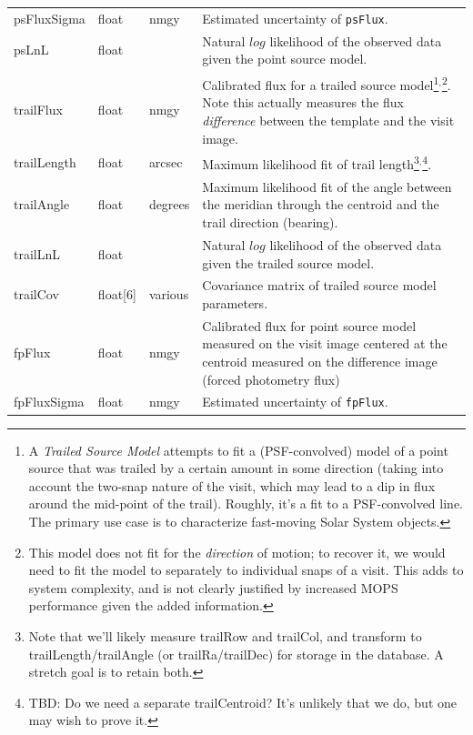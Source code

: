 \documentclass[12pt]{article}
\begin{document}
\begin{center}
\begin{longtable}{p{3cm}p{2cm}p{2cm}p{5cm}}
psFluxSigma & float & nmgy & Estimated uncertainty of \texttt{psFlux}. \\

psLnL & float & ~ & Natural $log$ likelihood of the observed data given the point source model. \\ 

trailFlux & float & nmgy & Calibrated flux for a trailed source model\footnote{A {\em Trailed Source Model} attempts to fit a (PSF-convolved) model of a point source that was trailed by a certain amount in some direction (taking into account the two-snap nature of the visit, which may lead to a dip in flux around the mid-point of the trail). Roughly, it's a fit to a PSF-convolved line. The primary use case is to characterize fast-moving Solar System objects.}$^,$\footnote{This model does not fit for the {\em direction} of motion; to recover it, we would need to fit the model to separately to individual snaps of a visit. This adds to system complexity, and is not clearly justified by increased MOPS performance given the added information.}. Note this actually measures the flux {\em difference} between the template and the visit image. \\ 

trailLength & float & arcsec & Maximum likelihood fit of trail length\footnote{Note that we'll likely measure trailRow and trailCol, and transform to trailLength/trailAngle (or trailRa/trailDec) for storage in the database. A stretch goal is to retain both.}$^,$\footnote{TBD: Do we need a separate trailCentroid? It's unlikely that we do, but one may wish to prove it.}. \\ 

trailAngle & float & degrees & Maximum likelihood fit of the angle between the meridian through the centroid and the trail direction (bearing). \\ 

trailLnL & float & ~ & Natural $log$ likelihood of the observed data given the trailed source model. \\ 

trailCov & float[6] & various & Covariance matrix of trailed source model parameters. \\ 

fpFlux & float & nmgy & Calibrated flux for point source model measured on the visit image centered at the centroid measured on the difference image (forced photometry flux) \\ 

fpFluxSigma & float & nmgy & Estimated uncertainty of \texttt{fpFlux}. \\ 


\end{longtable}
\end{center}
\end{document}
